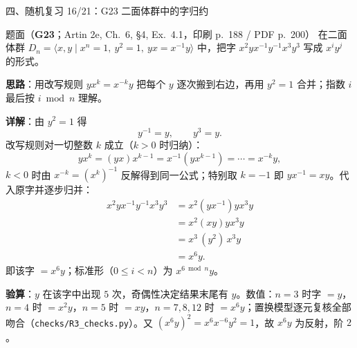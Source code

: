 \documentclass[aspectratio=169,10pt,fontset=none]{ctexbeamer}
\newcommand{\ex}[1]{\textcolor{accent}{\footnotesize\bfseries #1}}
\newcommand{\key}[1]{\textcolor{ink}{\bfseries #1}}
\begin{document}
\begin{frame}[t]{四、随机复习 16/21：G23 二面体群中的字归约}
\label{ex:G23}
\scriptsize
\begin{block}{\footnotesize 题面（\ex{G23}；Artin 2e, Ch.~6, \S4, Ex.~4.1，印刷 p.~188 / PDF p.~200）}
在二面体群 $D_n=\langle x,y\mid x^n=1,\ y^2=1,\ yx=x^{-1}y\rangle$ 中，把字 $x^2yx^{-1}y^{-1}x^3y^3$ 写成 $x^iy^j$ 的形式。
\end{block}
\key{思路}：用改写规则 $yx^k=x^{-k}y$ 把每个 $y$ 逐次搬到右边，再用 $y^2=1$ 合并；指数 $i$ 最后按 $i\bmod n$ 理解。

\key{详解}：由 $y^2=1$ 得
\[ y^{-1}=y,\qquad y^3=y. \]
改写规则对一切整数 $k$ 成立（$k>0$ 时归纳）：
\[ yx^k=(yx)x^{k-1}=x^{-1}(yx^{k-1})=\cdots=x^{-k}y, \]
$k<0$ 时由 $x^{-k}=(x^k)^{-1}$ 反解得到同一公式；特别取 $k=-1$ 即 $yx^{-1}=xy$。代入原字并逐步归并：
\[
\begin{aligned}
x^2yx^{-1}y^{-1}x^3y^3
&=x^2(yx^{-1})yx^3y\\
&=x^2(xy)yx^3y\\
&=x^3\,(y^2)\,x^3y\\
&=x^6y.
\end{aligned}
\]
即该字 $=x^6y$；标准形（$0\le i<n$）为 $x^{6\bmod n}y$。

\key{验算}：$y$ 在该字中出现 $5$ 次，奇偶性决定结果末尾有 $y$。数值：$n=3$ 时字 $=y$，$n=4$ 时 $=x^2y$，$n=5$ 时 $=xy$，$n=7,8,12$ 时 $=x^6y$；置换模型逐元复核全部吻合（\texttt{checks/R3\_checks.py}）。又 $(x^6y)^2=x^6x^{-6}y^2=1$，故 $x^6y$ 为反射，阶 $2$。
\end{frame}
\end{document}
